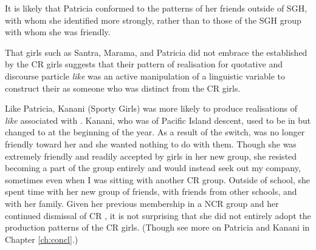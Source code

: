 \label{ex:patricia2}


\noindent It is likely that Patricia conformed to the patterns of her friends outside of SGH, with whom she identified more strongly, rather than to those of the SGH group with whom she was friendly.


 

That girls such as Santra, Marama, and Patricia did not embrace the  established by the CR girls suggests that their pattern of  realisation for quotative and discourse particle \textit{like} was an active manipulation of a linguistic variable to construct their  as someone who was distinct from the CR girls.

Like Patricia, Kanani (Sporty Girls) was more likely to produce realisations of \textit{like} associated with . Kanani, who was of Pacific Island descent, used to be in  but changed to  at the beginning of the year. As a result of the switch,  was no longer friendly toward her and she wanted nothing to do with them. Though she was extremely friendly and readily accepted by girls in her new group, she resisted becoming a part of the group entirely and would instead seek out my company, sometimes even when I was sitting with another CR group. Outside of school, she spent time with her new group of friends, with friends from other schools, and with her family. Given her previous membership in a NCR group and her continued dismissal of CR , it is not surprising that she did not entirely adopt the production patterns of the CR girls. (Though see more on Patricia and Kanani in Chapter \ref{ch:concl}.)

